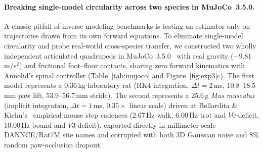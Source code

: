 \documentclass[10pt,twocolumn,letterpaper]{article}
\begin{document}
\paragraph{Breaking single-model circularity across two species in MuJoCo~3.5.0.}
A classic pitfall of inverse-modeling benchmarks is testing an estimator only on trajectories drawn from its own forward equations. To eliminate single-model circularity and probe real-world cross-species transfer, we constructed two wholly independent articulated quadrupeds in MuJoCo~3.5.0~\cite{todorov2012mujoco} with real gravity ($-9.81$\,m/s$^2$) and frictional foot--floor contacts, sharing zero forward kinematics with Annolid's spinal controller (Table~\ref{tab:mujoco} and Figure~\ref{fig:exp3}c). The first model represents a 0.36\,kg laboratory rat (RK4 integration, $\Delta t=2$\,ms, 10.8--18.5\,mm paw lift, 53.9--56.7\,mm stride). The second represents a 25.6\,g \emph{Mus musculus} (implicit integration, $\Delta t=1$\,ms, $0.35\times$ linear scale) driven at Bellardita \& Kiehn's~\cite{bellardita2015v0} empirical mouse step cadences (2.67\,Hz walk, 6.00\,Hz trot and $V0$-deficit, 10.00\,Hz bound and $V3$-deficit), exported directly in millimeter-scale DANNCE/Rat7M site names and corrupted with both 3D Gaussian noise and 8\% random paw-occlusion dropout.
\end{document}
